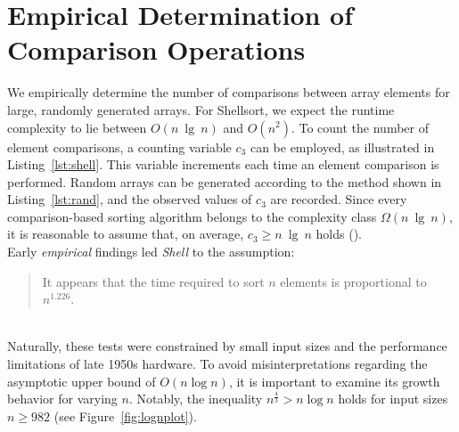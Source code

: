 \section{Empirical Determination of Comparison Operations}

We empirically determine the number of comparisons between array elements for large, randomly generated arrays.
For Shellsort, we expect the runtime complexity to lie between $O(n\ \lg\ n)$ and $O(n^2)$.
To count the number of element comparisons, a counting variable $c_3$ can be employed, as illustrated in Listing~\ref{lst:shell}.
This variable increments each time an element comparison is performed.
Random arrays can be generated according to the method shown in Listing~\ref{lst:rand}, and the observed values of $c_3$ are recorded.
Since every comparison-based sorting algorithm belongs to the complexity class $\Omega(n\ \lg\ n)$, it is reasonable to assume that, on average, $c_3 \geq n\ \lg\ n$ holds (\cite[154]{OW17b}).\\

Early \textit{empirical} findings led \textit{Shell} to the assumption:\\

\blockquote[{\cite[31]{She59}}]{It appears that the time required to sort $n$ elements is proportional to $n^{1.226}$.
}\\

Naturally, these tests were constrained by small input sizes and the performance limitations of late 1950s hardware.
To avoid misinterpretations regarding the asymptotic upper bound of $O(n \log n)$, it is important to examine its growth behavior for varying $n$.
Notably, the inequality $n^{\frac{4}{3}} > n \log n$ holds for input sizes $n \geq 982$ (see Figure~\ref{fig:lognplot}).


